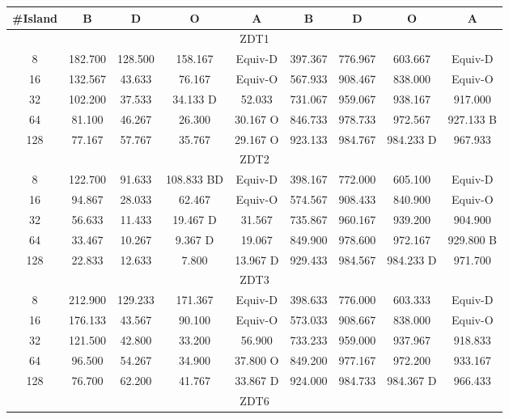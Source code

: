 \documentclass[preprint]{elsarticle}
\begin{document}
\begin{table}
{\begin{tabular}{|c||c|c|c|c||c|c|c|c||}
\#Island	&	B		&	D		&	O			&	A			&	B		&	D			&	O			&	A				\\ \hline
\multicolumn{9}{|c|}{ZDT1}																				\\ \hline
8	&	182.700		&	128.500		&	158.167			&	Equiv-D			&	397.367		&	776.967			&	603.667			&	Equiv-D				\\
16	&	132.567		&	43.633		&	76.167			&	Equiv-O			&	567.933		&	908.467			&	838.000			&	Equiv-O				\\
32	&	102.200		&	37.533		&	34.133	D		&	52.033			&	731.067		&	959.067			&	938.167			&	917.000				\\
64	&	81.100		&	46.267		&	26.300			&	30.167		O	&	846.733		&	978.733			&	972.567			&	927.133	B			\\
128	&	77.167		&	57.767		&	35.767			&	29.167		O	&	923.133		&	984.767			&	984.233	D		&	967.933				\\ \hline
\multicolumn{9}{|c|}{ZDT2}																															\\ \hline
8	&	122.700		&	91.633		&	108.833	BD		&	Equiv-D			&	398.167		&	772.000			&	605.100			&	Equiv-D				\\
16	&	94.867		&	28.033		&	62.467			&	Equiv-O			&	574.567		&	908.433			&	840.900			&	Equiv-O				\\
32	&	56.633		&	11.433		&	19.467	D		&	31.567			&	735.867		&	960.167			&	939.200			&	904.900				\\
64	&	33.467		&	10.267		&	9.367	D		&	19.067			&	849.900		&	978.600			&	972.167			&	929.800	B			\\
128	&	22.833		&	12.633		&	7.800			&	13.967		D	&	929.433		&	984.567			&	984.233	D		&	971.700				\\ \hline
\multicolumn{9}{|c|}{ZDT3}																															\\ \hline
8	&	212.900		&	129.233		&	171.367			&	Equiv-D			&	398.633		&	776.000			&	603.333			&	Equiv-D				\\
16	&	176.133		&	43.567		&	90.100			&	Equiv-O			&	573.033		&	908.667			&	838.000			&	Equiv-O				\\
32	&	121.500		&	42.800		&	33.200			&	56.900			&	733.233		&	959.000			&	937.967			&	918.833				\\
64	&	96.500		&	54.267		&	34.900			&	37.800		O	&	849.200		&	977.167			&	972.200			&	933.167				\\
128	&	76.700		&	62.200		&	41.767			&	33.867		D	&	924.000		&	984.733			&	984.367	D		&	966.433				\\ \hline
\multicolumn{9}{|c|}{ZDT6}																															\\ \hline

\end{tabular}}
\end{table}
\end{document}
